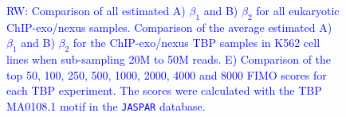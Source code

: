 \documentclass{bmcart}
\newcommand{\RW}[1]{\textcolor{blue}{RW: #1}}
\begin{document}
\begin{figure}[h!]
\caption{\RW{Comparison of all estimated A) $\beta_1$ and B) $\beta_2$
    for all eukaryotic ChIP-exo/nexus samples. Comparison of the
    average estimated A) $\beta_1$ and B) $\beta_2$ for the
    ChIP-exo/nexus TBP samples in K562 cell lines when sub-sampling
    20M to 50M reads. E) Comparison of the top 50, 100, 250, 500,
    1000, 2000, 4000 and 8000 FIMO scores for each TBP experiment. The
    scores were calculated with the TBP MA0108.1 motif in the
    \texttt{JASPAR} database.}}
  \label{fig:5}
\end{figure}

\newpage

\end{document}
